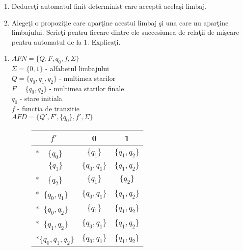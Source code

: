 \begin{enumerate}
\begin{enumerate}
\item Deduceţi automatul finit determinist care acceptă acelaşi limbaj.
\item Alegeţi o propoziţie care aparţine acestui limbaj şi una care nu aparţine limbajului. Scrieţi pentru fiecare dintre ele succesiunea de relaţii de mişcare pentru automatul de la 1. Explicaţi.
\end{enumerate}

\begin{enumerate}
\item 
$AFN = \{Q, F, q_0, f, \Sigma \}$\\
$\Sigma = \{ 0, 1 \}$ - alfabetul limbajului\\
$Q = \{ q_{0}, q_{1}, q_{2} \}$ - multimea starilor\\
$F=\{q_0, q_{2} \}$ - multimea starilor finale\\
$q_{0}$ - stare initiala\\
$f$ - functia de tranzitie \\

$AFD = \{Q', F', \{q_0\}, f', \Sigma \}$\\

\begin{figure}[H]
\centering
\begin{tabular}{ l | c c }
      $\;\;\;\;\;\;\;f'$     	&   0 		&            1\\
   \hline
  *$\;\;\;\;\{q_{0}\}$    	& $\{q_{1}\}$ 		& $\{q_{1}, q_2\}$\\
   $\;\;\;\;\;\;\{q_{1}\}$	& $\{q_{0}, q_1\}$	& $\{q_{1}, q_2\}$\\
  *$\;\;\;\;\{q_{2}\}$   	& $\{q_1 \}$ 		& $\{q_2\}$\\
  *$\;\;\{q_{0}, q_1\}$	 	& $\{q_{0}, q_1\}$ 	& $\{q_{1}, q_2\}$\\
  *$\;\;\{q_{0}, q_2\}$	 	& $\{q_{1}\}$ 		& $\{q_{1}, q_2\}$\\
  *$\;\;\{q_{1}, q_2\}$	 	& $\{q_{0}, q_1\}$ 	& $\{q_{1}, q_2\}$\\
  *$\{q_{0}, q_1, q_2\}$	& $\{q_{0}, q_1\}$ 	& $\{q_1, q_2\}$\\
\end{tabular}
\end{figure}

\begin{figure}[H]
\centering
{}
\end{figure}
\end{enumerate}
\end{enumerate}
